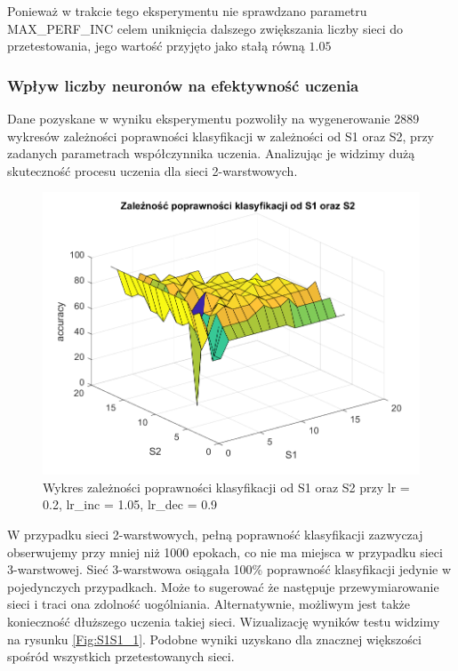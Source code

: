 \documentclass[12pt,twoside]{article}
\begin{document}
Ponieważ w trakcie tego eksperymentu nie sprawdzano parametru MAX\_PERF\_INC celem uniknięcia dalszego zwiększania liczby sieci do przetestowania, jego wartość przyjęto jako stałą równą $1.05$

\clearpage
\subsubsection{Wpływ liczby neuronów na efektywność uczenia}
Dane pozyskane w wyniku eksperymentu pozwoliły na wygenerowanie 2889 wykresów zależności poprawności klasyfikacji w zależności od S1 oraz S2, przy zadanych parametrach współczynnika uczenia.
Analizując je widzimy dużą skuteczność procesu uczenia dla sieci 2-warstwowych.


\begin{figure}[ht]
	\centering
	\includegraphics[width=16cm]{figures/S1S2_1.png}
	\caption{Wykres zależności poprawności klasyfikacji od S1 oraz S2 przy lr = 0.2, lr\_inc = 1.05, lr\_dec = 0.9}
	\label{Fig:S1S2_1}
\end{figure}

W przypadku sieci 2-warstwowych, pełną poprawność klasyfikacji zazwyczaj obserwujemy przy mniej niż 1000 epokach, co nie ma miejsca w przypadku sieci 3-warstwowej.
Sieć 3-warstwowa osiągała 100\% poprawność klasyfikacji jedynie w pojedynczych przypadkach.
Może to sugerować że następuje przewymiarowanie sieci i traci ona zdolność uogólniania.
Alternatywnie, możliwym jest także konieczność dłuższego uczenia takiej sieci.
Wizualizację wyników testu widzimy na rysunku \ref{Fig:S1S1_1}.
Podobne wyniki uzyskano dla znacznej większości spośród wszystkich przetestowanych sieci.
\end{document}

